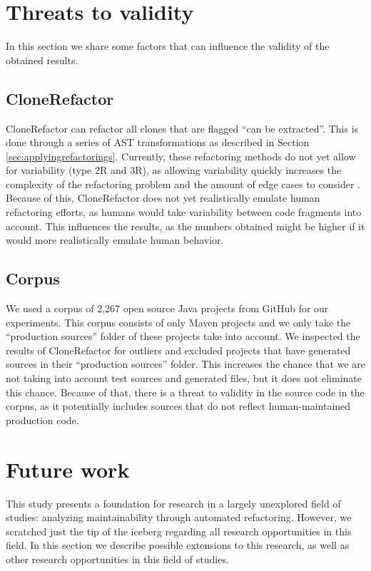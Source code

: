 
\section{Threats to validity}\label{chap:threatstovalidity}
In this section we share some factors that can influence the validity of the obtained results.

\subsection{CloneRefactor}
CloneRefactor can refactor all clones that are flagged ``can be extracted''. This is done through a series of AST transformations as described in Section \ref{sec:applyingrefactorings}. Currently, these refactoring methods do not yet allow for variability (type 2R and 3R), as allowing variability quickly increases the complexity of the refactoring problem and the amount of edge cases to consider \cite{tsantalis2015assessing}. Because of this, CloneRefactor does not yet realistically emulate human refactoring efforts, as humans would take variability between code fragments into account. This influences the results, as the numbers obtained might be higher if it would more realistically emulate human behavior.

\subsection{Corpus}
We used a corpus of 2,267 open source Java projects from GitHub for our experiments. This corpus consists of only Maven projects and we only take the ``production sources'' folder of these projects take into account. We inspected the results of CloneRefactor for outliers and excluded projects that have generated sources in their ``production sources'' folder. This increases the chance that we are not taking into account test sources and generated files, but it does not eliminate this chance. Because of that, there is a threat to validity in the source code in the corpus, as it potentially includes sources that do not reflect human-maintained production code.

\section{Future work} \label{sec:future_work}
This study presents a foundation for research in a largely unexplored field of studies: analyzing maintainability through automated refactoring. However, we scratched just the tip of the iceberg regarding all research opportunities in this field. In this section we describe possible extensions to this research, as well as other research opportunities in this field of studies.

